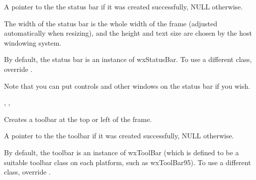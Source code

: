 


A pointer to the the status bar if it was created successfully, NULL otherwise.


The width of the status bar is the whole width of the frame (adjusted automatically when
resizing), and the height and text size are chosen by the host windowing system.

By default, the status bar is an instance of wxStatusBar. To use a different class,
override .

Note that you can put controls and other windows on the status bar if you wish.


,\rtfsp
{},\rtfsp
{}

\label{wxframecreatetoolbar}


Creates a toolbar at the top or left of the frame.






A pointer to the the toolbar if it was created successfully, NULL otherwise.


By default, the toolbar is an instance of wxToolBar (which is defined to be
a suitable toolbar class on each platform, such as wxToolBar95). To use a different class,
override .

